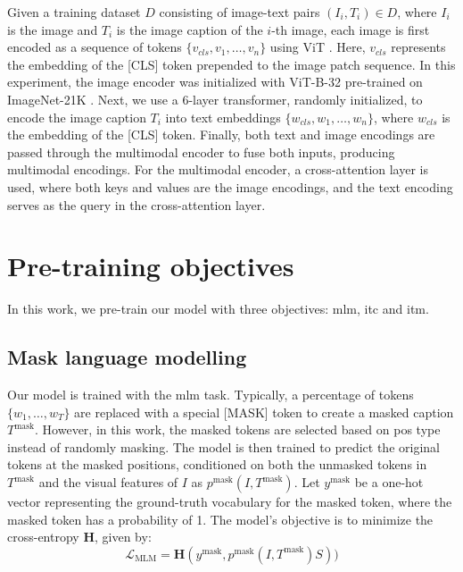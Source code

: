 Given a training dataset \(D\) consisting of image-text pairs \((I_i, T_i) \in D\), where \(I_i\) is the image and \(T_i\) is the image caption of the \(i\)-th image, each image is first encoded as a sequence of tokens \(\{v_{cls}, v_1, \dots, v_n\}\) using ViT \cite{vit}. 
Here, \(v_{cls}\) represents the embedding of the [CLS] token prepended to the image patch sequence. 
In this experiment, the image encoder was initialized with ViT-B-32 pre-trained on ImageNet-21K \cite{imagenet}.
Next, we use a 6-layer transformer, randomly initialized, to encode the image caption \(T_i\) into text embeddings \(\{w_{cls}, w_1, \dots, w_n\}\), where \(w_{cls}\) is the embedding of the [CLS] token. 
Finally, both text and image encodings are passed through the multimodal encoder to fuse both inputs, producing multimodal encodings. 
For the multimodal encoder, a cross-attention layer is used, where both keys and values are the image encodings, and the text encoding serves as the query in the cross-attention layer.


\section{Pre-training objectives}
In this work, we pre-train our model with three objectives: \acrfull{mlm}, \acrfull{itc} and \acrfull{itm}.
\subsection{Mask language modelling}
Our model is trained with the \acrlong{mlm} task. 
Typically, a percentage of tokens \(\{w_1, \dots, w_T\}\) are replaced with a special [MASK] token to create a masked caption \(T^{\text{mask}}\). 
However, in this work, the masked tokens are selected based on \acrshort{pos} type instead of randomly masking. 
The model is then trained to predict the original tokens at the masked positions, conditioned on both the unmasked tokens in \(T^{\text{mask}}\) and the visual features of \(I\) as \(p^{\text{mask}}(I, T^{\text{mask}})\).
Let \(y^{\text{mask}}\) be a one-hot vector representing the ground-truth vocabulary for the masked token, where the masked token has a probability of 1. 
The model’s objective is to minimize the cross-entropy \(\mathbf{H}\), given by:
\[
    \mathcal{L}_{\text{MLM}} = \mathbf{H}(y^{\text{mask}}, p^{\text{mask}}(I, T^{\text{mask}})S))
\]

